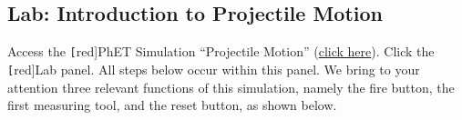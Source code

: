 \documentclass[dvipsnames]{article}
\begin{document}
\subsection{Lab: Introduction to Projectile Motion}

Access the \texttt[red]{PhET Simulation} ``Projectile Motion'' (\href{https://phet.colorado.edu/sims/html/projectile-motion/latest/projectile-motion_all.html}{click here}). Click the \texttt[red]{Lab} panel. All steps below occur within this panel. We bring to your attention three relevant functions of this simulation, namely the fire button, the first measuring tool, and the reset button, as shown below.

\begin{center}
    \hspace{5mm}
    \hspace{5mm}
\end{center}
\end{document}
